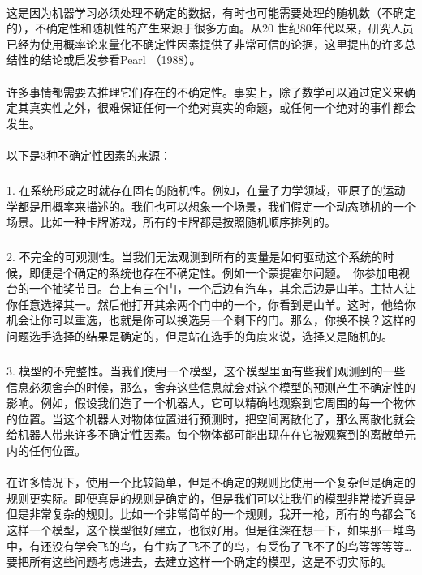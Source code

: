 \documentclass{article}
\begin{document}
    \paragraph{}
    这是因为机器学习必须处理不确定的数据，有时也可能需要处理的随机数（不确定的），不确定性和随机性的产生来源于很多方面。从20 世纪80年代以来，研究人员已经为使用概率论来量化不确定性因素提供了非常可信的论据，这里提出的许多总结性的结论或启发参看Pearl （1988）。
    \paragraph{}
    许多事情都需要去推理它们存在的不确定性。事实上，除了数学可以通过定义来确定其真实性之外，很难保证任何一个绝对真实的命题，或任何一个绝对的事件都会发生。
    \paragraph{}以下是3种不确定性因素的来源：
    \subparagraph{}
    1.	在系统形成之时就存在固有的随机性。例如，在量子力学领域，亚原子的运动学都是用概率来描述的。我们也可以想象一个场景，我们假定一个动态随机的一个场景。比如一种卡牌游戏，所有的卡牌都是按照随机顺序排列的。
     \subparagraph{}
     2.	不完全的可观测性。当我们无法观测到所有的变量是如何驱动这个系统的时候，即便是个确定的系统也存在不确定性。例如一个蒙提霍尔问题。　你参加电视台的一个抽奖节目。台上有三个门，一个后边有汽车，其余后边是山羊。主持人让你任意选择其一。然后他打开其余两个门中的一个，你看到是山羊。这时，他给你机会让你可以重选，也就是你可以换选另一个剩下的门。那么，你换不换？这样的问题选手选择的结果是确定的，但是站在选手的角度来说，选择又是随机的。
     \subparagraph{}
     3.	模型的不完整性。当我们使用一个模型，这个模型里面有些我们观测到的一些信息必须舍弃的时候，那么，舍弃这些信息就会对这个模型的预测产生不确定性的影响。例如，假设我们造了一个机器人，它可以精确地观察到它周围的每一个物体的位置。当这个机器人对物体位置进行预测时，把空间离散化了，那么离散化就会给机器人带来许多不确定性因素。每个物体都可能出现在在它被观察到的离散单元内的任何位置。
    \paragraph{}
    在许多情况下，使用一个比较简单，但是不确定的规则比使用一个复杂但是确定的规则更实际。即便真是的规则是确定的，但是我们可以让我们的模型非常接近真是但是非常复杂的规则。比如一个非常简单的一个规则，我开一枪，所有的鸟都会飞这样一个模型，这个模型很好建立，也很好用。但是往深在想一下，如果那一堆鸟中，有还没有学会飞的鸟，有生病了飞不了的鸟，有受伤了飞不了的鸟等等等等…要把所有这些问题考虑进去，去建立这样一个确定的模型，这是不切实际的。
\end{document}
